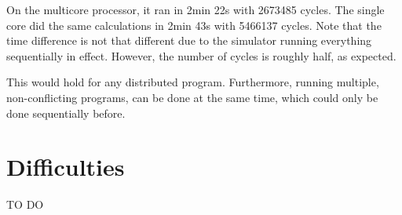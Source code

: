\documentclass{article}
\begin{document}
On the multicore processor, it ran in 2min 22s with 2673485 cycles. The single core did the same calculations in 2min 43s with 5466137 cycles. Note that the time difference is not that different due to the simulator running everything sequentially in effect. However, the number of cycles is roughly half, as expected.

This would hold for any distributed program. Furthermore, running multiple, non-conflicting programs, can be done at the same time, which could only be done sequentially before.


\section{Difficulties}
 TO DO
\end{document}
